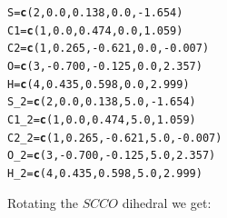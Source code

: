 \documentclass{article}\usepackage[]{graphicx}\usepackage[]{color}
\makeatletter
\newcommand{\hlnum}[1]{\textcolor[rgb]{0.686,0.059,0.569}{#1}}%
\newcommand{\hlopt}[1]{\textcolor[rgb]{0,0,0}{#1}}%
\newcommand{\hlstd}[1]{\textcolor[rgb]{0.345,0.345,0.345}{#1}}%
\newcommand{\hlkwb}[1]{\textcolor[rgb]{0.69,0.353,0.396}{#1}}%
\newcommand{\hlkwd}[1]{\textcolor[rgb]{0.737,0.353,0.396}{\textbf{#1}}}%
\newenvironment{kframe}{%
 \def\at@end@of@kframe{}%
 \ifinner\ifhmode%
  \def\at@end@of@kframe{\end{minipage}}%
  \begin{minipage}{\columnwidth}%
 \fi\fi%
 \def\FrameCommand##1{\hskip\@totalleftmargin \hskip-\fboxsep
 \colorbox{shadecolor}{##1}\hskip-\fboxsep
     \hskip-\linewidth \hskip-\@totalleftmargin \hskip\columnwidth}%
 \MakeFramed {\advance\hsize-\width
   \@totalleftmargin\z@ \linewidth\hsize
   \@setminipage}}%
 {\par\unskip\endMakeFramed%
 \at@end@of@kframe}
\newenvironment{knitrout}{}{} %
\makeatother
\begin{document}
\begin{knitrout}
\color{fgcolor}\begin{kframe}
\begin{alltt}
  \hlstd{S}\hlkwb{=}\hlkwd{c}\hlstd{(}\hlnum{2}\hlstd{,}\hlnum{0.0}\hlstd{,}\hlnum{0.138}\hlstd{,}\hlnum{0.0}\hlstd{,}\hlopt{-}\hlnum{1.654}\hlstd{)}
  \hlstd{C1}\hlkwb{=}\hlkwd{c}\hlstd{(}\hlnum{1}\hlstd{,}\hlnum{0.0}\hlstd{,}\hlnum{0.474}\hlstd{,}\hlnum{0.0}\hlstd{,}\hlnum{1.059}\hlstd{)}
  \hlstd{C2}\hlkwb{=}\hlkwd{c}\hlstd{(}\hlnum{1}\hlstd{,}\hlnum{0.265}\hlstd{,}\hlopt{-}\hlnum{0.621}\hlstd{,}\hlnum{0.0}\hlstd{,}\hlopt{-}\hlnum{0.007}\hlstd{)}
  \hlstd{O}\hlkwb{=}\hlkwd{c}\hlstd{(}\hlnum{3}\hlstd{,}\hlopt{-}\hlnum{0.700}\hlstd{,}\hlopt{-}\hlnum{0.125}\hlstd{,}\hlnum{0.0}\hlstd{,}\hlnum{2.357}\hlstd{)}
  \hlstd{H}\hlkwb{=}\hlkwd{c}\hlstd{(}\hlnum{4}\hlstd{,}\hlnum{0.435}\hlstd{,}\hlnum{0.598}\hlstd{,}\hlnum{0.0}\hlstd{,}\hlnum{2.999}\hlstd{)}
  \hlstd{S_2}\hlkwb{=}\hlkwd{c}\hlstd{(}\hlnum{2}\hlstd{,}\hlnum{0.0}\hlstd{,}\hlnum{0.138}\hlstd{,}\hlnum{5.0}\hlstd{,}\hlopt{-}\hlnum{1.654}\hlstd{)}
  \hlstd{C1_2}\hlkwb{=}\hlkwd{c}\hlstd{(}\hlnum{1}\hlstd{,}\hlnum{0.0}\hlstd{,}\hlnum{0.474}\hlstd{,}\hlnum{5.0}\hlstd{,}\hlnum{1.059}\hlstd{)}
  \hlstd{C2_2}\hlkwb{=}\hlkwd{c}\hlstd{(}\hlnum{1}\hlstd{,}\hlnum{0.265}\hlstd{,}\hlopt{-}\hlnum{0.621}\hlstd{,}\hlnum{5.0}\hlstd{,}\hlopt{-}\hlnum{0.007}\hlstd{)}
  \hlstd{O_2}\hlkwb{=}\hlkwd{c}\hlstd{(}\hlnum{3}\hlstd{,}\hlopt{-}\hlnum{0.700}\hlstd{,}\hlopt{-}\hlnum{0.125}\hlstd{,}\hlnum{5.0}\hlstd{,}\hlnum{2.357}\hlstd{)}
  \hlstd{H_2}\hlkwb{=}\hlkwd{c}\hlstd{(}\hlnum{4}\hlstd{,}\hlnum{0.435}\hlstd{,}\hlnum{0.598}\hlstd{,}\hlnum{5.0}\hlstd{,}\hlnum{2.999}\hlstd{)}
\end{alltt}
\end{kframe}
\end{knitrout}

Rotating the $SCCO$ dihedral we get:
\end{document}

